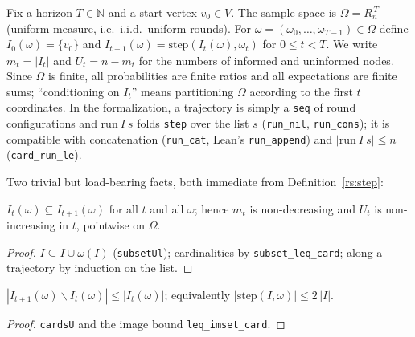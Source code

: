 \begin{definition}[Process]\label{rs:process}
  \rocqok
  Fix a horizon $T \in \mathbb{N}$ and a start vertex $v_0 \in V$. The sample
  space is $\Omega = R_n^{\,T}$ (uniform measure, i.e.\ i.i.d.\ uniform
  rounds). For $\omega = (\omega_0,\dots,\omega_{T-1}) \in \Omega$ define
  $I_0(\omega) = \{v_0\}$ and
  $I_{t+1}(\omega) = \mathrm{step}(I_t(\omega), \omega_t)$ for $0 \le t < T$.
  We write $m_t = |I_t|$ and $U_t = n - m_t$ for the numbers of informed and
  uninformed nodes. Since $\Omega$ is finite, all probabilities are finite
  ratios and all expectations are finite sums; ``conditioning on $I_t$''
  means partitioning $\Omega$ according to the first $t$ coordinates. In the
  formalization, a trajectory is simply a \texttt{seq} of round
  configurations and $\mathrm{run}\ I\ s$ folds \texttt{step} over the list
  $s$ (\texttt{run\_nil}, \texttt{run\_cons}); it is compatible with
  concatenation (\texttt{run\_cat}, Lean's \texttt{run\_append}) and
  $|\mathrm{run}\ I\ s| \le n$ (\texttt{card\_run\_le}).
\end{definition}

Two trivial but load-bearing facts, both immediate from
Definition~\ref{rs:step}:

\begin{lemma}[Monotonicity]\label{rs:mono}
  \rocqok
  $I_t(\omega) \subseteq I_{t+1}(\omega)$ for all $t$ and all $\omega$;
  hence $m_t$ is non-decreasing and $U_t$ is non-increasing in $t$,
  pointwise on $\Omega$.
\end{lemma}
\begin{proof}
  \rocqok
  $I \subseteq I \cup \omega(I)$ (\texttt{subsetUl}); cardinalities by
  \texttt{subset\_leq\_card}; along a trajectory by induction on the list.
\end{proof}

\begin{lemma}\label{rs:atmost}
  \rocqok
  $|I_{t+1}(\omega) \smallsetminus I_t(\omega)| \le |I_t(\omega)|$; equivalently
  $|\mathrm{step}(I,\omega)| \le 2\,|I|$.
\end{lemma}
\begin{proof}
  \rocqok
  \texttt{cardsU} and the image bound \texttt{leq\_imset\_card}.
\end{proof}

